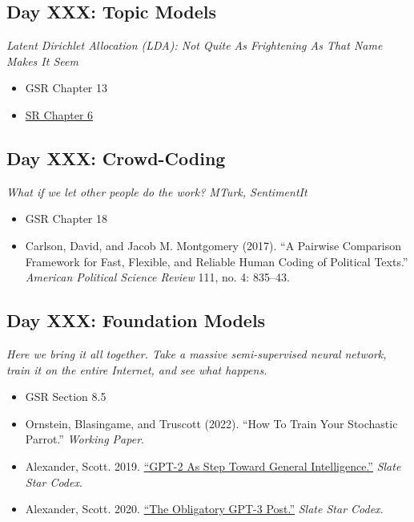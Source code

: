 \documentclass[11pt, letterpaper]{article}
\begin{document}
\subsection*{Day XXX: Topic Models}

\textit{Latent Dirichlet Allocation (LDA): Not Quite As Frightening As That Name Makes It Seem}

\begin{itemize}
	\item GSR Chapter 13
	\item \href{https://www.tidytextmining.com/topicmodeling.html}{SR Chapter 6}
\end{itemize}

\subsection*{Day XXX: Crowd-Coding}

\textit{What if we let other people do the work? MTurk, SentimentIt}

\begin{itemize}
	\item GSR Chapter 18
	\item Carlson, David, and Jacob M. Montgomery (2017). ``A Pairwise Comparison Framework for Fast, Flexible, and Reliable Human Coding of Political Texts.'' \textit{American Political Science Review} 111, no. 4: 835–43.
	
\end{itemize}

\subsection*{Day XXX: Foundation Models}

\textit{Here we bring it all together. Take a massive semi-supervised neural network, train it on the entire Internet, and see what happens.}

\begin{itemize}
	\item GSR Section 8.5
	\item Ornstein, Blasingame, and Truscott (2022). ``How To Train Your Stochastic Parrot.'' \textit{Working Paper}.
	\item Alexander, Scott. 2019. \href{https://slatestarcodex.com/2019/02/19/gpt-2-as-step-toward-general-intelligence/}{``GPT-2 As Step Toward General Intelligence.''} \textit{Slate Star Codex}.
	\item Alexander, Scott. 2020. \href{https://slatestarcodex.com/2020/06/10/the-obligatory-gpt-3-post/}{``The Obligatory GPT-3 Post.''} \textit{Slate Star Codex.}
		
\end{itemize}
\end{document}
